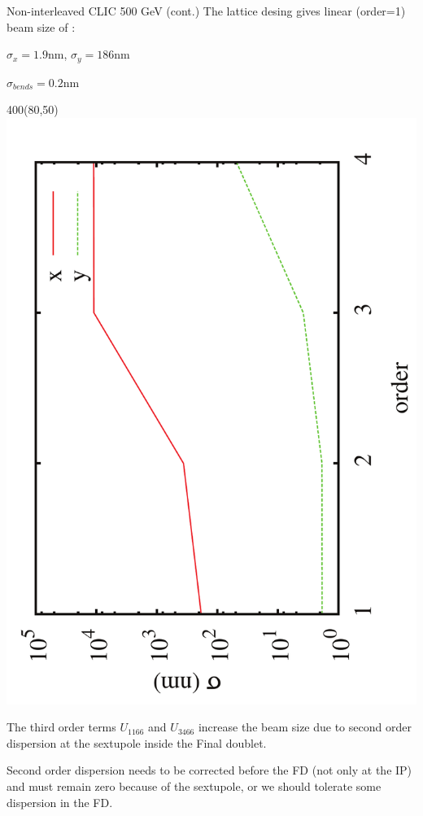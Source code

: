 \documentclass{beamer}
\begin{document}
\begin{frame}{Non-interleaved CLIC 500 GeV (cont.)}
The lattice desing gives linear (order=1) beam size of :\par $\sigma_x = 1.9 \text{nm}$, $\sigma_y = 186 \text{nm}$\par
\vspace*{4cm}
$\sigma_{bends}=0.2$nm\par
\setlength{\TPHorizModule}{1pt}
  \setlength{\TPVertModule}{1pt}
 \begin{textblock}{400}(80,50)
 \includegraphics[scale=0.25,angle=-90]{sigmas.pdf}
 \end{textblock}
\vspace*{0.5cm}
The third order terms $U_{1166}$ and $U_{3466}$ increase the beam size due to second order dispersion at the sextupole inside the Final doublet.\par
Second order dispersion needs to be corrected before the FD (not only at the IP) and must remain zero because of the sextupole, or we should tolerate some dispersion in the FD.\par

\vspace*{4cm}
\end{frame}
\end{document}

